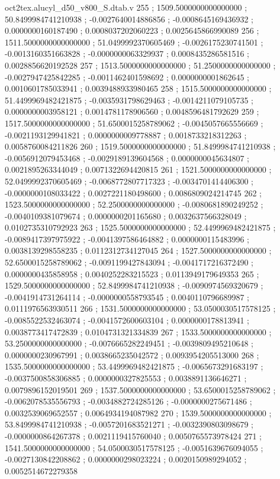 \begin{filecontents}[overwrite]{oct2tex.alucyl_d50_v800_S.dtab.v}
255 ; 1509.5000000000000000 ; 50.8499984741210938 ; -0.0027640014886856 ; -0.0008645169436932 ; 0.0000000160187490 ; 0.0008037202060223 ; 0.0025645866990089
256 ; 1511.5000000000000000 ; 51.0499992370605469 ; -0.0026175230741501 ; -0.0013160351663828 ; -0.0000000063329937 ; 0.0008435286581516 ; 0.0028856620192528
257 ; 1513.5000000000000000 ; 51.2500000000000000 ; -0.0027947425842285 ; -0.0011462401598692 ; 0.0000000001862645 ; 0.0010601785033941 ; 0.0039488933980465
258 ; 1515.5000000000000000 ; 51.4499969482421875 ; -0.0035931798629463 ; -0.0014211079105735 ; 0.0000000003958121 ; 0.0014781178906560 ; 0.0048596481792629
259 ; 1517.5000000000000000 ; 51.6500015258789062 ; -0.0045057665556669 ; -0.0021193129941821 ; 0.0000000009778887 ; 0.0018733218312263 ; 0.0058760084211826
260 ; 1519.5000000000000000 ; 51.8499984741210938 ; -0.0056912079453468 ; -0.0029189139604568 ; 0.0000000045634807 ; 0.0021895263344049 ; 0.0071322694420815
261 ; 1521.5000000000000000 ; 52.0499992370605469 ; -0.0068772807717323 ; -0.0034701414406300 ; -0.0000000108033422 ; 0.0027221180498600 ; 0.0086809024214745
262 ; 1523.5000000000000000 ; 52.2500000000000000 ; -0.0080681890249252 ; -0.0040109381079674 ; 0.0000000201165680 ; 0.0032637566328049 ; 0.0102735310792923
263 ; 1525.5000000000000000 ; 52.4499969482421875 ; -0.0089417397975922 ; -0.0041397586464882 ; 0.0000000115483996 ; 0.0038139298558235 ; 0.0112312734127045
264 ; 1527.5000000000000000 ; 52.6500015258789062 ; -0.0091199427843094 ; -0.0041717216372490 ; 0.0000000435858958 ; 0.0040252283215523 ; 0.0113949179649353
265 ; 1529.5000000000000000 ; 52.8499984741210938 ; -0.0090974569320679 ; -0.0041914731264114 ; -0.0000000558793545 ; 0.0040110796689987 ; 0.0111976563930511
266 ; 1531.5000000000000000 ; 53.0500030517578125 ; -0.0085522532463074 ; -0.0041572600603104 ; 0.0000000178813941 ; 0.0038773417472839 ; 0.0104731321334839
267 ; 1533.5000000000000000 ; 53.2500000000000000 ; -0.0076665282249451 ; -0.0039809495210648 ; 0.0000000230967991 ; 0.0038665235042572 ; 0.0093954205513000
268 ; 1535.5000000000000000 ; 53.4499969482421875 ; -0.0065673291683197 ; -0.0037500858306885 ; 0.0000000327825553 ; 0.0038891136646271 ; 0.0079896152019501
269 ; 1537.5000000000000000 ; 53.6500015258789062 ; -0.0062078535556793 ; -0.0034882724285126 ; -0.0000000275671486 ; 0.0032539069652557 ; 0.0064934194087982
270 ; 1539.5000000000000000 ; 53.8499984741210938 ; -0.0057201683521271 ; -0.0032390803098679 ; -0.0000000864267378 ; 0.0021119415760040 ; 0.0050765573978424
271 ; 1541.5000000000000000 ; 54.0500030517578125 ; -0.0051639676094055 ; -0.0027130842208862 ; 0.0000000298023224 ; 0.0020150989294052 ; 0.0052514672279358

\end{filecontents}

